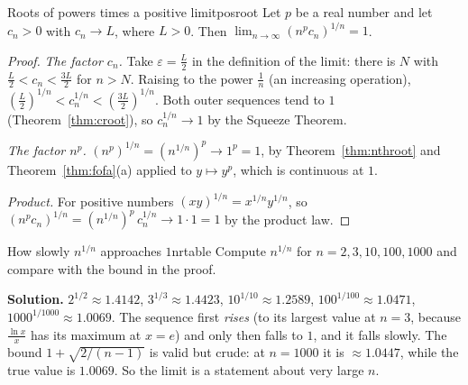 \documentclass[11pt]{article}
\begin{document}
\begin{thm}{Roots of powers times a positive limit}{posroot}
Let $p$ be a real number and let $c_n>0$ with $c_n\to L$, where $L>0$. Then $\displaystyle\lim_{n\to\infty}\left(n^pc_n\right)^{1/n}=1$.
\end{thm}
\begin{proof}
\emph{The factor $c_n$.} Take $\varepsilon=\frac L2$ in the definition of the limit: there is $N$ with $\frac L2<c_n<\frac{3L}2$ for $n>N$. Raising to the power $\frac1n$ (an increasing operation), $\left(\frac L2\right)^{1/n}<c_n^{1/n}<\left(\frac{3L}2\right)^{1/n}$. Both outer sequences tend to $1$ (Theorem~\ref{thm:croot}), so $c_n^{1/n}\to1$ by the Squeeze Theorem.

\emph{The factor $n^p$.} $(n^p)^{1/n}=\left(n^{1/n}\right)^p\to1^p=1$, by Theorem~\ref{thm:nthroot} and Theorem~\ref{thm:fofa}(a) applied to $y\mapsto y^p$, which is continuous at $1$.

\emph{Product.} For positive numbers $(xy)^{1/n}=x^{1/n}y^{1/n}$, so $\left(n^pc_n\right)^{1/n}=\left(n^{1/n}\right)^p\,c_n^{1/n}\to1\cdot1=1$ by the product law.
\end{proof}

\begin{exmp}{How slowly $n^{1/n}$ approaches $1$}{nrtable}
Compute $n^{1/n}$ for $n=2,3,10,100,1000$ and compare with the bound in the proof.

\textbf{Solution.} $2^{1/2}\approx1.4142$, $3^{1/3}\approx1.4423$, $10^{1/10}\approx1.2589$, $100^{1/100}\approx1.0471$, $1000^{1/1000}\approx1.0069$. The sequence first \emph{rises} (to its largest value at $n=3$, because $\frac{\ln x}x$ has its maximum at $x=e$) and only then falls to $1$, and it falls slowly. The bound $1+\sqrt{2/(n-1)}$ is valid but crude: at $n=1000$ it is $\approx1.0447$, while the true value is $1.0069$. So the limit is a statement about very large $n$.
\end{exmp}
\end{document}
